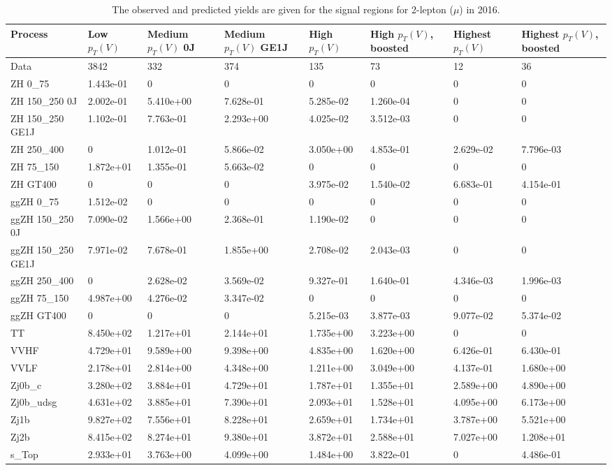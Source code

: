 \begin{table}
\centering
\caption[2016 2-lepton ($\mu$) signal selection yields]{
                  The observed and predicted yields are given for the
                  signal regions for 2-lepton ($\mu$) in 2016.
                  }
{\footnotesize
\begin{tabularx}{\textwidth}{|X|X|X|X|X|X|X|X|}
\hline
Process & Low $p_{T}(V)$ & Medium $p_{T}(V)$ 0J & Medium $p_{T}(V)$ GE1J & High $p_{T}(V)$ & High $p_{T}(V)$, boosted & Highest $p_{T}(V)$ & Highest $p_{T}(V)$, boosted \\
\hline
Data & 3842 & 332 & 374 & 135 & 73 & 12 & 36 \\
\hline
ZH 0\_75 & 1.443e-01 & 0 & 0 & 0 & 0 & 0 & 0 \\
ZH 150\_250 0J & 2.002e-01 & 5.410e+00 & 7.628e-01 & 5.285e-02 & 1.260e-04 & 0 & 0 \\
ZH 150\_250 GE1J & 1.102e-01 & 7.763e-01 & 2.293e+00 & 4.025e-02 & 3.512e-03 & 0 & 0 \\
ZH 250\_400 & 0 & 1.012e-01 & 5.866e-02 & 3.050e+00 & 4.853e-01 & 2.629e-02 & 7.796e-03 \\
ZH 75\_150 & 1.872e+01 & 1.355e-01 & 5.663e-02 & 0 & 0 & 0 & 0 \\
ZH GT400 & 0 & 0 & 0 & 3.975e-02 & 1.540e-02 & 6.683e-01 & 4.154e-01 \\
ggZH 0\_75 & 1.512e-02 & 0 & 0 & 0 & 0 & 0 & 0 \\
ggZH 150\_250 0J & 7.090e-02 & 1.566e+00 & 2.368e-01 & 1.190e-02 & 0 & 0 & 0 \\
ggZH 150\_250 GE1J & 7.971e-02 & 7.678e-01 & 1.855e+00 & 2.708e-02 & 2.043e-03 & 0 & 0 \\
ggZH 250\_400 & 0 & 2.628e-02 & 3.569e-02 & 9.327e-01 & 1.640e-01 & 4.346e-03 & 1.996e-03 \\
ggZH 75\_150 & 4.987e+00 & 4.276e-02 & 3.347e-02 & 0 & 0 & 0 & 0 \\
ggZH GT400 & 0 & 0 & 0 & 5.215e-03 & 3.877e-03 & 9.077e-02 & 5.374e-02 \\
\hline
TT & 8.450e+02 & 1.217e+01 & 2.144e+01 & 1.735e+00 & 3.223e+00 & 0 & 0 \\
VVHF & 4.729e+01 & 9.589e+00 & 9.398e+00 & 4.835e+00 & 1.620e+00 & 6.426e-01 & 6.430e-01 \\
VVLF & 2.178e+01 & 2.814e+00 & 4.348e+00 & 1.211e+00 & 3.049e+00 & 4.137e-01 & 1.680e+00 \\
Zj0b\_c & 3.280e+02 & 3.884e+01 & 4.729e+01 & 1.787e+01 & 1.355e+01 & 2.589e+00 & 4.890e+00 \\
Zj0b\_udsg & 4.631e+02 & 3.885e+01 & 7.390e+01 & 2.093e+01 & 1.528e+01 & 4.095e+00 & 6.173e+00 \\
Zj1b & 9.827e+02 & 7.556e+01 & 8.228e+01 & 2.659e+01 & 1.734e+01 & 3.787e+00 & 5.521e+00 \\
Zj2b & 8.415e+02 & 8.274e+01 & 9.380e+01 & 3.872e+01 & 2.588e+01 & 7.027e+00 & 1.208e+01 \\
s\_Top & 2.933e+01 & 3.763e+00 & 4.099e+00 & 1.484e+00 & 3.822e-01 & 0 & 4.486e-01 \\
\hline
\end{tabularx}
}
\label{tab:sr-Zmm-2016}
\end{table}

